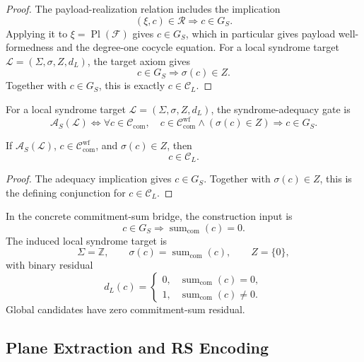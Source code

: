 \begin{proof}
The payload-realization relation includes the implication
\[
  (\xi,c)\in\mathcal R
  \Longrightarrow c\in G_S.
\]
Applying it to \(\xi=\operatorname{Pl}(\mathcal F)\) gives
\(c\in G_S\), which in particular gives payload well-formedness and the
degree-one cocycle equation. For a local syndrome target
\(\mathcal L=(\Sigma,\sigma,Z,d_L)\), the target axiom gives
\[
  c\in G_S\Longrightarrow \sigma(c)\in Z.
\]
Together with \(c\in G_S\), this is exactly \(c\in\mathcal C_L\).
\end{proof}

\begin{definition}\label{def:syndrome-adequacy-gate}
For a local syndrome target \(\mathcal L=(\Sigma,\sigma,Z,d_L)\), the syndrome-adequacy
gate is
\[
  \mathcal A_S(\mathcal L)
  \Longleftrightarrow
  \forall c\in\mathcal C_{\mathrm{com}},\quad
  c\in\mathcal C_{\mathrm{com}}^{\mathrm{wf}}\wedge(\sigma(c)\in Z)
  \Longrightarrow
  c\in G_S.
\]
\end{definition}

\begin{proposition}\label{prop:zero-syndrome-codeword}
If \(\mathcal A_S(\mathcal L)\), \(c\in\mathcal C_{\mathrm{com}}^{\mathrm{wf}}\),
and \(\sigma(c)\in Z\), then
\[
  c\in\mathcal C_L.
\]
\end{proposition}

\begin{proof}
The adequacy implication gives \(c\in G_S\). Together with
\(\sigma(c)\in Z\), this is the defining conjunction for
\(c\in\mathcal C_L\).
\end{proof}

In the concrete commitment-sum bridge, the construction input is
\[
  c\in G_S
  \Longrightarrow
  \operatorname{sum}_{\mathrm{com}}(c)=0.
\]
The induced local syndrome target is
\[
  \Sigma=\mathbb Z,\qquad
  \sigma(c)=\operatorname{sum}_{\mathrm{com}}(c),\qquad
  Z=\{0\},
\]
with binary residual
\[
  d_L(c)=
  \begin{cases}
    0,& \operatorname{sum}_{\mathrm{com}}(c)=0,\\
    1,& \operatorname{sum}_{\mathrm{com}}(c)\ne 0.
  \end{cases}
\]
Global candidates have zero commitment-sum residual.

\subsection{Plane Extraction and RS Encoding}

